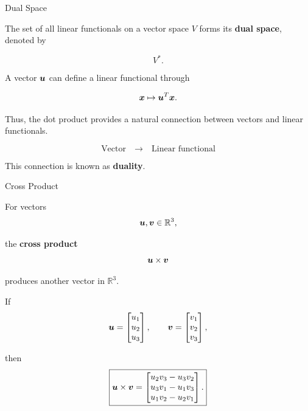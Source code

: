 \begin{frame}{Dual Space}

The set of all linear functionals on a vector space $V$
forms its \textbf{dual space}, denoted by

\[
\boxed{
V^*.
}
\]

A vector $\bm{u}$ can define a linear functional through

\[
\bm{x}
\mapsto
\bm{u}^{T}\bm{x}.
\]

Thus, the dot product provides a natural connection between
vectors and linear functionals.

\vspace{0.4cm}

\[
\boxed{
\text{Vector}
\quad\longrightarrow\quad
\text{Linear functional}
}
\]

This connection is known as \textbf{duality}.

\end{frame}



\begin{frame}{Cross Product}

For vectors
\vspace{-0.1cm}
\[
\bm{u},\bm{v}\in\mathbb{R}^3,
\]

the \textbf{cross product}
\vspace{-0.1cm}
\[
\bm{u}\times\bm{v}
\]

produces another vector in $\mathbb{R}^3$.

If
\vspace{-0.1cm}
\[
\bm{u}
=
\begin{bmatrix}
u_1\\u_2\\u_3
\end{bmatrix},
\qquad
\bm{v}
=
\begin{bmatrix}
v_1\\v_2\\v_3
\end{bmatrix},
\]

then
\vspace{-0.1cm}
\[
\boxed{
\bm{u}\times\bm{v}
=
\begin{bmatrix}
u_2v_3-u_3v_2\\
u_3v_1-u_1v_3\\
u_1v_2-u_2v_1
\end{bmatrix}.
}
\]

\end{frame}


